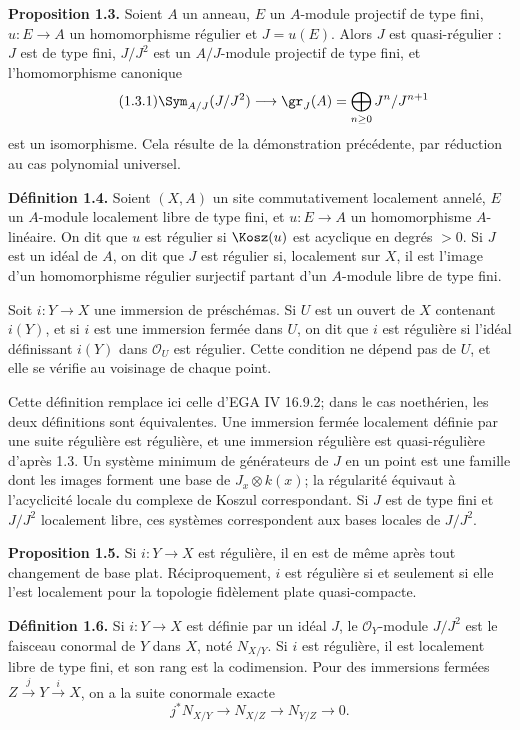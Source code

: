 \documentclass[11pt]{article}
\providecommand{\cO}{\mathcal O}
\begin{document}
\textbf{Proposition 1.3.} Soient \(A\) un anneau, \(E\) un \(A\)-module projectif de type fini, \(u:E\to A\) un homomorphisme régulier et \(J=u(E)\). Alors \(J\) est quasi-régulier : \(J\) est de type fini, \(J/J^2\) est un \(A/J\)-module projectif de type fini, et l'homomorphisme canonique
\begin{equation}\tag{1.3.1}
 \Sym_{A/J}(J/J^2)\longrightarrow \gr_J(A)=\bigoplus_{n\ge0}J^n/J^{n+1}
\end{equation}
est un isomorphisme. Cela résulte de la démonstration précédente, par réduction au cas polynomial universel.

\textbf{Définition 1.4.} Soient \((X,A)\) un site commutativement localement annelé, \(E\) un \(A\)-module localement libre de type fini, et \(u:E\to A\) un homomorphisme \(A\)-linéaire. On dit que \(u\) est régulier si \(\Kosz(u)\) est acyclique en degrés \(>0\). Si \(J\) est un idéal de \(A\), on dit que \(J\) est régulier si, localement sur \(X\), il est l'image d'un homomorphisme régulier surjectif partant d'un \(A\)-module libre de type fini.

Soit \(i:Y\to X\) une immersion de préschémas. Si \(U\) est un ouvert de \(X\) contenant \(i(Y)\), et si \(i\) est une immersion fermée dans \(U\), on dit que \(i\) est régulière si l'idéal définissant \(i(Y)\) dans \(\cO_U\) est régulier. Cette condition ne dépend pas de \(U\), et elle se vérifie au voisinage de chaque point.

Cette définition remplace ici celle d'EGA IV 16.9.2; dans le cas noethérien, les deux définitions sont équivalentes. Une immersion fermée localement définie par une suite régulière est régulière, et une immersion régulière est quasi-régulière d'après 1.3. Un système minimum de générateurs de \(J\) en un point est une famille dont les images forment une base de \(J_x\otimes k(x)\); la régularité équivaut à l'acyclicité locale du complexe de Koszul correspondant. Si \(J\) est de type fini et \(J/J^2\) localement libre, ces systèmes correspondent aux bases locales de \(J/J^2\).

\textbf{Proposition 1.5.} Si \(i:Y\to X\) est régulière, il en est de même après tout changement de base plat. Réciproquement, \(i\) est régulière si et seulement si elle l'est localement pour la topologie fidèlement plate quasi-compacte.

\textbf{Définition 1.6.} Si \(i:Y\to X\) est définie par un idéal \(J\), le \(\cO_Y\)-module \(J/J^2\) est le faisceau conormal de \(Y\) dans \(X\), noté \(N_{X/Y}\). Si \(i\) est régulière, il est localement libre de type fini, et son rang est la codimension. Pour des immersions fermées \(Z\xrightarrow{j}Y\xrightarrow{i}X\), on a la suite conormale exacte
\begin{equation}\tag{1.6.1}
 j^*N_{X/Y}\longrightarrow N_{X/Z}\longrightarrow N_{Y/Z}\longrightarrow0.
\end{equation}
\end{document}
